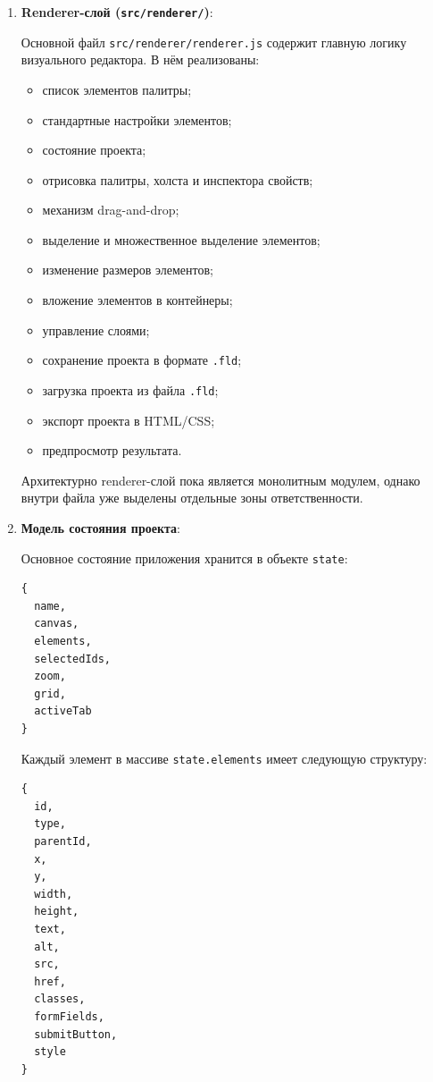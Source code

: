 \documentclass[14pt,a4paper]{extarticle}
\begin{document}
{{\begin{enumerate}
    Благодаря этому renderer-слой не получает прямого доступа к Node.js, что повышает безопасность Electron-приложения.

    \item \textbf{Renderer-слой (\texttt{src/renderer/})}:

    Основной файл \texttt{src/renderer/renderer.js} содержит главную логику визуального редактора. В нём реализованы:
    \begin{itemize}
        \item список элементов палитры;
        \item стандартные настройки элементов;
        \item состояние проекта;
        \item отрисовка палитры, холста и инспектора свойств;
        \item механизм drag-and-drop;
        \item выделение и множественное выделение элементов;
        \item изменение размеров элементов;
        \item вложение элементов в контейнеры;
        \item управление слоями;
        \item сохранение проекта в формате \texttt{.fld};
        \item загрузка проекта из файла \texttt{.fld};
        \item экспорт проекта в HTML/CSS;
        \item предпросмотр результата.
    \end{itemize}

    Архитектурно renderer-слой пока является монолитным модулем, однако внутри файла уже выделены отдельные зоны ответственности.

    \item \textbf{Модель состояния проекта}:

    Основное состояние приложения хранится в объекте \texttt{state}:

    \begin{verbatim}
{
  name,
  canvas,
  elements,
  selectedIds,
  zoom,
  grid,
  activeTab
}
    \end{verbatim}

    Каждый элемент в массиве \texttt{state.elements} имеет следующую структуру:

    \begin{verbatim}
{
  id,
  type,
  parentId,
  x,
  y,
  width,
  height,
  text,
  alt,
  src,
  href,
  classes,
  formFields,
  submitButton,
  style
}
    \end{verbatim}


\end{enumerate}}}
\end{document}
